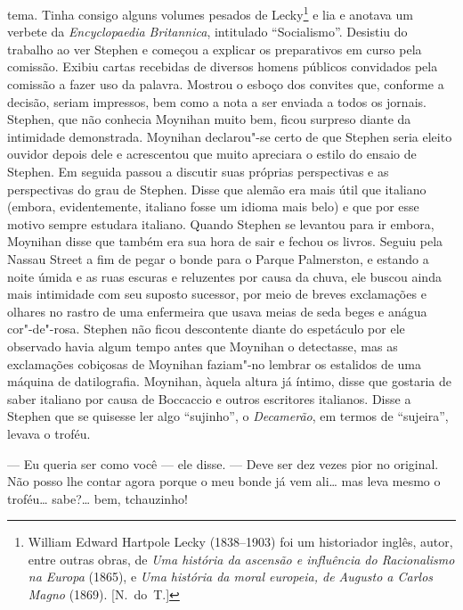 tema.  Tinha consigo alguns volumes pesados de Lecky\footnote{ William Edward
Hartpole Lecky (1838--1903) foi um historiador inglês, autor, entre outras
obras, de \textit{Uma  história da ascensão e influência do Racionalismo na
Europa} (1865), e \textit{Uma história da moral europeia, de Augusto a
Carlos Magno} (1869). [N.~do~T.]} e lia e anotava um verbete da
\textit{Encyclopaedia Britannica}, intitulado “Socialismo”.  Desistiu do
trabalho ao ver Stephen e começou a explicar os preparativos em curso pela
comissão.  Exibiu cartas recebidas de diversos homens públicos convidados pela
comissão a fazer uso da palavra.  Mostrou o esboço dos convites que, conforme a
decisão, seriam impressos, bem como a nota a ser enviada a todos os jornais.
Stephen, que não conhecia Moynihan muito bem, ficou surpreso diante da
intimidade demonstrada.  Moynihan declarou"-se certo de que Stephen seria eleito
ouvidor depois dele e acrescentou que muito apreciara o estilo do ensaio de
Stephen.  Em seguida passou a discutir suas próprias perspectivas e as
perspectivas do grau de Stephen.  Disse que alemão era mais útil que italiano
(embora, evidentemente, italiano fosse um idioma mais belo) e que por esse
motivo sempre estudara italiano.  Quando Stephen se levantou para ir embora,
Moynihan disse que também era sua hora de sair e fechou os livros.  Seguiu pela
Nassau Street a fim de pegar o bonde para o Parque Palmerston, e estando a
noite úmida e as ruas escuras e reluzentes por causa da chuva, ele buscou ainda
mais intimidade com seu suposto sucessor, por meio de breves exclamações e
olhares no rastro de uma enfermeira que usava meias de seda beges e anágua
cor"-de"-rosa.  Stephen não ficou descontente diante do espetáculo por ele
observado havia algum tempo antes que Moynihan o detectasse, mas as exclamações
cobiçosas de Moynihan faziam"-no lembrar os estalidos de uma máquina de
datilografia.  Moynihan, àquela altura já íntimo, disse que gostaria de saber
italiano por causa de Boccaccio e outros escritores italianos.  Disse a Stephen
que se quisesse ler algo “sujinho”, o \textit{Decamerão}, em termos de		
“sujeira”, levava o troféu.

--- Eu queria ser como você --- ele disse.  --- Deve ser dez vezes pior no
original.  Não posso lhe contar agora porque o meu bonde já vem ali\ldots{} mas leva
mesmo o troféu\ldots{} sabe?\ldots{} bem, tchauzinho!

